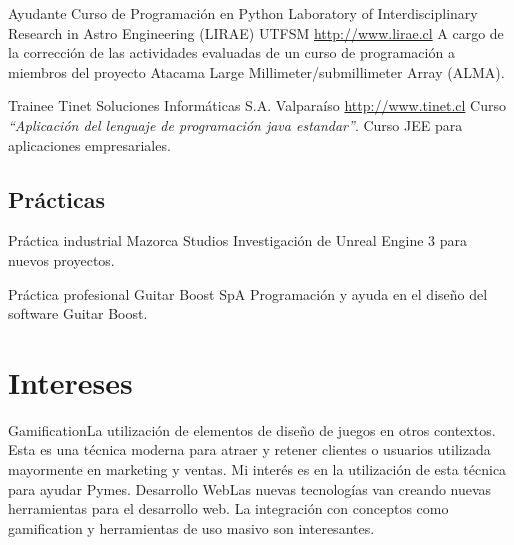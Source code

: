 \documentclass[letter,10pt]{moderncv}
\begin{document}
        {Ayudante Curso de Programación en Python}
        {Laboratory of Interdisciplinary Research in Astro Engineering (LIRAE)}
        {UTFSM}
        {\url{http://www.lirae.cl}}
        {A cargo de la corrección de las actividades evaluadas de un curso
        de programación a miembros del proyecto Atacama Large Millimeter/submillimeter
        Array (ALMA).}

        {Trainee}
        {Tinet Soluciones Informáticas S.A.}
        {Valparaíso}
        {\url{http://www.tinet.cl}}
        {Curso \emph{``Aplicación del lenguaje de programación java estandar''}. Curso JEE para aplicaciones
	empresariales.}

\subsection{Prácticas}

        {Práctica industrial}
        {Mazorca Studios}
        {}
        {}
        {Investigación de Unreal Engine 3 para nuevos proyectos.}%

        {Práctica profesional}
        {Guitar Boost SpA}
        {}
        {}
        {Programación y ayuda en el diseño del software Guitar Boost.}%

\section{Intereses}
           {Gamification}{La utilización de elementos de diseño de juegos en otros 
	   contextos. Esta es una técnica moderna para atraer y retener clientes 
           o usuarios utilizada mayormente en marketing y ventas. Mi interés es en
           la utilización de esta técnica para ayudar Pymes.}
	   {Desarrollo Web}{Las nuevas tecnologías van creando nuevas herramientas
	   para el desarrollo web. La integración con conceptos como gamification y
	   herramientas de uso masivo son interesantes.}
\end{document}
